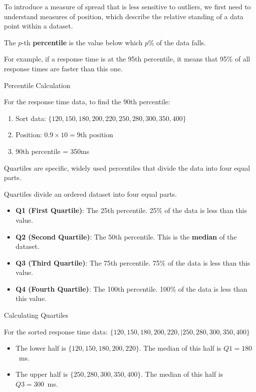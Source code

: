To introduce a measure of spread that is less sensitive to outliers, we first need to understand measures of position, which describe the relative standing of a data point within a dataset.

\begin{definition}[Percentile]
The $p$-th \textbf{percentile} is the value below which $p\%$ of the data falls.
\end{definition}

For example, if a response time is at the 95th percentile, it means that 95\% of all response times are faster than this one.

\begin{example} Percentile Calculation

    For the response time data, to find the 90th percentile:
\begin{enumerate}
        \item Sort data: $\{120, 150, 180, 200, 220, 250, 280, 300, 350, 400\}$
        \item Position: $0.9 \times 10 = 9$th position
        \item 90th percentile = 350ms
\end{enumerate}
    \end{example}

Quartiles are specific, widely used percentiles that divide the data into four equal parts.

\begin{definition}[Quartiles]

Quartiles divide an ordered dataset into four equal parts.

\begin{itemize}
    \item \textbf{Q1 (First Quartile)}: The 25th percentile. 25\% of the data is less than this value.
    \item \textbf{Q2 (Second Quartile)}: The 50th percentile. This is the \textbf{median} of the dataset.
    \item \textbf{Q3 (Third Quartile)}: The 75th percentile. 75\% of the data is less than this value.
    \item \textbf{Q4 (Fourth Quartile)}: The 100th percentile. 100\% of the data is less than this value.
\end{itemize}
\end{definition}

\begin{example} Calculating Quartiles

For the sorted response time data: $\{120, 150, 180, 200, 220, | 250, 280, 300, 350, 400\}$
\begin{itemize}
    \item The lower half is $\{120, 150, 180, 200, 220\}$. The median of this half is $Q1 = 180$~ms.
    \item The upper half is $\{250, 280, 300, 350, 400\}$. The median of this half is $Q3 = 300$~ms.
\end{itemize}
\end{example}

